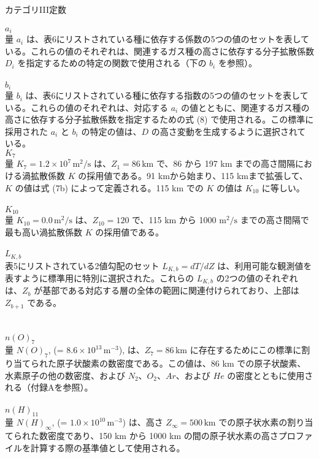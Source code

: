 \documentclass{article}
\begin{document}
\\カテゴリIII定数\\
\\$a_i$\\
量 $a_i$ は、表6にリストされている種に依存する係数の5つの値のセットを表している。これらの値のそれぞれは、関連するガス種の高さに依存する分子拡散係数 $D_i$ を指定するための特定の関数で使用される（下の $b_i$ を参照）。\\
\\$b_i$\\
量 $b_i$ は、表6にリストされている種に依存する指数の5つの値のセットを表している。これらの値のそれぞれは、対応する $a_i$ の値とともに、関連するガス種の高さに依存する分子拡散係数を指定するための式 (8) で使用される。この標準に採用された $a_i$ と $b_i$ の特定の値は、$D$ の高さ変動を生成するように選択されている。
\\$K_7$\\
量 $K_7 = 1.2 \times 10^7 \, \mathrm{m^2/s}$ は、$Z_1 = 86 \, \mathrm{km}$ で、86 から 197 km までの高さ間隔における渦拡散係数 $K$ の採用値である。91 kmから始まり、115 kmまで拡張して、$K$ の値は式 (7b) によって定義される。115 km での $K$ の値は $K_{10}$ に等しい。\\
\\$K_{10}$\\
量 $K_{10} = 0.0 \, \text{m}^2/\text{s}$ は、$Z_{10} = 120$ で、115 km から 1000 $\text{m}^2/\text{s}$ までの高さ間隔で最も高い渦拡散係数 $K$ の採用値である。\\
\\$L_{K,b}$\\
表5にリストされている2値勾配のセット $L_{K,b} = dT/dZ$ は、利用可能な観測値を表すように標準用に特別に選択された。これらの $L_{K,b}$ の2つの値のそれぞれは、$Z_b$ が基部である対応する層の全体の範囲に関連付けられており、上部は $Z_{b+1}$ である。\\\\
\\$n(O)_7$\\
量 $N(O)_7$, (= $8.6 \times 10^{13} \, \text{m}^{-3}$), は、$Z_7 = 86 \, \text{km}$ に存在するためにこの標準に割り当てられた原子状酸素の数密度である。この値は、86 km での原子状酸素、水素原子の他の数密度、および $N_2$、$O_2$、$Ar$、および $He$ の密度とともに使用される（付録Aを参照）。\\
\\$n(H)_{11}$\\
量 $N(H)_\infty$, (= $1.0 \times 10^{10} \, \text{m}^{-3}$) は、高さ $Z_\infty = 500 \, \text{km}$ での原子状水素の割り当てられた数密度であり、150 km から 1000 km の間の原子状水素の高さプロファイルを計算する際の基準値として使用される。\\
\end{document}
